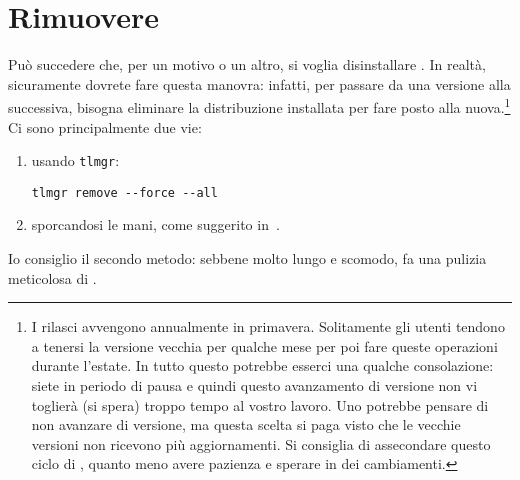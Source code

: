 
\section{Rimuovere \texlive{}}

Può succedere che, per un motivo o un altro, si voglia disinstallare \texlive{}. In realtà, sicuramente dovrete fare questa manovra: infatti, per passare da una versione alla successiva, bisogna eliminare la distribuzione installata per fare posto alla nuova.\footnote{I rilasci avvengono annualmente in primavera. Solitamente gli utenti tendono a tenersi la versione vecchia per qualche mese per poi fare queste operazioni durante l'estate. In tutto questo potrebbe esserci una qualche consolazione: siete in periodo di pausa e quindi questo avanzamento di versione non vi toglierà (si spera) troppo tempo al vostro lavoro. Uno potrebbe pensare di non avanzare di versione, ma questa scelta si paga visto che le vecchie versioni non ricevono più aggiornamenti. Si consiglia di assecondare questo ciclo di , quanto meno avere pazienza e sperare in dei cambiamenti.} Ci sono principalmente due vie: 
\begin{enumerate}
\item usando \lstinline£tlmgr£:
\begin{lstlisting}
tlmgr remove --force --all
\end{lstlisting}
\item sporcandosi le mani, come suggerito in~\cite{exch:uninstall}.
\end{enumerate}
Io consiglio il secondo metodo: sebbene molto lungo e scomodo, fa una pulizia meticolosa di \texlive{}.